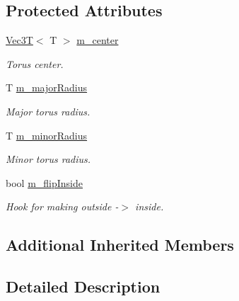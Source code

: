 \subsection*{Protected Attributes}
\begin{DoxyCompactItemize}
\item 
\mbox{\label{classTorusSDF_aa097ba79346768486083bf5269b20821}} 
\hyperlink{classVec3T}{Vec3T}$<$ T $>$ \hyperlink{classTorusSDF_aa097ba79346768486083bf5269b20821}{m\+\_\+center}
\begin{DoxyCompactList}\small\item\em Torus center. \end{DoxyCompactList}\item 
\mbox{\label{classTorusSDF_a21d443b0a0f8af98856cdc7bce0363ba}} 
T \hyperlink{classTorusSDF_a21d443b0a0f8af98856cdc7bce0363ba}{m\+\_\+major\+Radius}
\begin{DoxyCompactList}\small\item\em Major torus radius. \end{DoxyCompactList}\item 
\mbox{\label{classTorusSDF_afedc4aacff95c95b97d1d540dddd2e99}} 
T \hyperlink{classTorusSDF_afedc4aacff95c95b97d1d540dddd2e99}{m\+\_\+minor\+Radius}
\begin{DoxyCompactList}\small\item\em Minor torus radius. \end{DoxyCompactList}\item 
\mbox{\label{classTorusSDF_a41d7b8bbbf97d96d49432dcb1036573a}} 
bool \hyperlink{classTorusSDF_a41d7b8bbbf97d96d49432dcb1036573a}{m\+\_\+flip\+Inside}
\begin{DoxyCompactList}\small\item\em Hook for making outside -\/$>$ inside. \end{DoxyCompactList}\end{DoxyCompactItemize}
\subsection*{Additional Inherited Members}


\subsection{Detailed Description}
